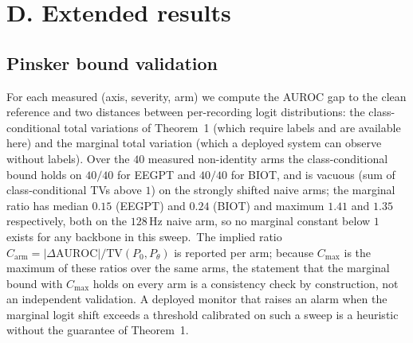 \documentclass[conference]{IEEEtran}
\newcommand{\PINSKERNUMBERS}{Over the $40$ measured non-identity arms the class-conditional bound holds on $40/40$ for EEGPT and $40/40$ for BIOT\PINSKERLABRAM, and is vacuous (sum of class-conditional TVs above $1$) on the strongly shifted naive arms; the marginal ratio has median $0.15$ (EEGPT) and $0.24$ (BIOT) and maximum $1.41$ and $1.35$ respectively, both on the $128$\,Hz naive arm, so no marginal constant below $1$ exists for any backbone in this sweep.}
\newcommand{\PINSKERLABRAM}{}
\begin{document}
\begin{table}[htbp]
\caption{Four contemporaneous approaches to heterogeneous EEG
acquisition. ``Fixes'' means a deterministic preprocessing contract;
``learns'' means invariance is trained into a model; ``measures''
means acquisition shift is simulated and recovery is measured.}
\label{tab:s7-compare}
\centering\scriptsize\setlength{\tabcolsep}{3pt}
\end{table}

\section*{D. Extended results}
\subsection{Pinsker bound validation}
\label{sec:pinsker_emp}
For each measured (axis, severity, arm) we compute the AUROC gap to the
clean reference and two distances between per-recording logit
distributions: the class-conditional total variations of
Theorem~1 (which require labels and are available here) and
the marginal total variation (which a deployed system can observe
without labels). \PINSKERNUMBERS\ The implied ratio $C_{\mathrm{arm}} =
|\Delta\mathrm{AUROC}| / \mathrm{TV}(P_0, P_\theta)$ is reported per
arm; because $C_{\max}$ is the maximum of these ratios over the same
arms, the statement that the marginal bound with $C_{\max}$ holds on
every arm is a consistency check by construction, not an independent
validation. A deployed monitor that raises an alarm when the marginal
logit shift exceeds a threshold calibrated on such a sweep is a
heuristic without the guarantee of Theorem~1.
\end{document}
